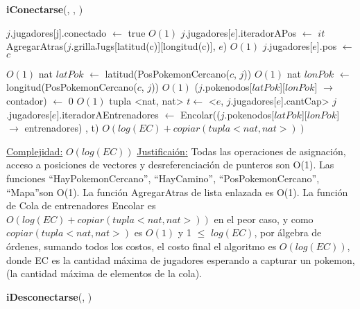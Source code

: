 \begin{Algoritmos}
\begin{algorithm}[H]
\begin{algorithmic}[1]
\end{algorithmic}
\end{algorithm}

\begin{algorithm}[H]
{\textbf{iConectarse}(, , )}
\begin{algorithmic}[1]

\State $j$.jugadores[\hspace{0.5mm}j\hspace{0.5mm}].conectado $\gets$ true \Comment $O(1)$
\State $j$.jugadores[$e$].iteradorAPos $\gets$ $it$ AgregarAtras($j$.grillaJugs[latitud(c)][longitud(c)], $e$) \Comment $O(1)$
\State $j$.jugadores[$e$].pos $\gets$ $c$

   \Comment $O(1)$
      \State nat $latPok$ $\gets$ latitud(PosPokemonCercano($c$, $j$)) \Comment $O(1)$
      \State nat $lonPok$ $\gets$ longitud(PosPokemonCercano($c$, $j$)) \Comment $O(1)$
      \State ($j$.pokenodos[$latPok$][$lonPok$] $\rightarrow$ contador) $\gets$ 0 \Comment $O(1)$
      \State tupla <nat, nat> $t \gets$ <$e$, $j$.jugadores[$e$].cantCap> 
      \State $j$.jugadores[$e$].iteradorAEntrenadores $\gets$ Encolar(($j$.pokenodos[$latPok$][$lonPok$] $\rightarrow$ entrenadores) , t) \Comment $O(log(EC) + copiar(tupla <nat, nat>))$

  \EndIf

\EndIf

\medskip
\State \underline{Complejidad:} $O(log(EC))$ 
\State \underline{Justificai\'on:} Todas las operaciones de asignaci\'on, acceso a posiciones de vectores y desreferenciaci\'on de punteros son O(1). Las funciones ``HayPokemonCercano'', ``HayCamino'', ``PosPokemonCercano'', ``Mapa''\hspace{0.5mm}son O(1). La funci\'on AgregarAtras de lista enlazada es O(1). La funci\'on de Cola de entrenadores Encolar es $O(log(EC) + copiar(tupla <nat, nat>))$ en el peor caso, y como $copiar(tupla <nat, nat>)$ es $O(1)$ y 1 $\leq$ $log(EC)$, por \'algebra de \'ordenes, sumando todos los costos, el costo final el algoritmo es $O(log(EC))$, donde EC es la cantidad m\'axima de jugadores esperando a capturar un pokemon, (la cantidad m\'axima de elementos de la cola).


\end{algorithmic}
\end{algorithm}

\begin{algorithm}[H]
{\textbf{iDesconectarse}(, )}
\begin{algorithmic}[1]


\end{algorithmic}
\end{algorithm}
\end{Algoritmos}
